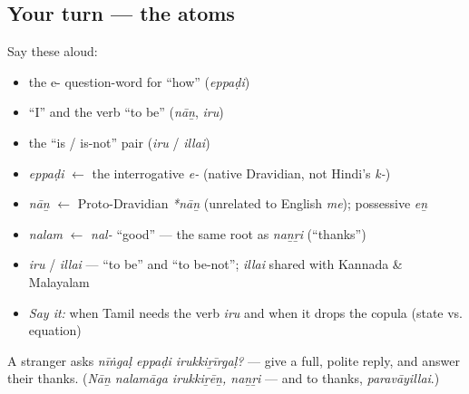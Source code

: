 \subsection*{Your turn — the atoms}
Say these aloud:

\begin{itemize}
\raggedright
  \item the e- question-word for \textquotedblleft{}how\textquotedblright{} (\emph{eppaḍi})
  \item \textquotedblleft{}I\textquotedblright{} and the verb \textquotedblleft{}to be\textquotedblright{} (\emph{nāṉ}, \emph{iru})
  \item the \textquotedblleft{}is / is-not\textquotedblright{} pair (\emph{iru} / \emph{illai})
\end{itemize}

\begin{grammarlens}[title={What you've built — roots you now carry}]
\begin{itemize}
\raggedright
  \item \emph{eppaḍi} $\leftarrow$ the interrogative \emph{e-} (native Dravidian, not Hindi's \emph{k-})
  \item \emph{nāṉ} $\leftarrow$ Proto-Dravidian \emph{*nāṉ} (unrelated to English \emph{me}); possessive \emph{eṉ}
  \item \emph{nalam} $\leftarrow$ \emph{nal-} \textquotedblleft{}good\textquotedblright{} — the same root as \emph{naṉṟi} (\textquotedblleft{}thanks\textquotedblright{})
  \item \emph{iru} / \emph{illai} — \textquotedblleft{}to be\textquotedblright{} and \textquotedblleft{}to be-not\textquotedblright{}; \emph{illai} shared with Kannada \& Malayalam
\end{itemize}
\end{grammarlens}

\begin{grammarlens}[title={Grammar lens — what you now hold}]
\begin{itemize}
\raggedright
  \item \emph{Say it:} when Tamil needs the verb \emph{iru} and when it drops the copula (state vs. equation)
\end{itemize}
\end{grammarlens}

\begin{tcolorbox}[breakable,colback=teal!4,colframe=teal!35!black,title={Before you move on}]
A stranger asks \emph{nīṅgaḷ eppaḍi irukkiṟīrgaḷ?} — give a full, polite reply, and answer their thanks. (\emph{Nāṉ nalamāga irukkiṟēṉ, naṉṟi} — and to thanks, \emph{paravāyillai}.)
\end{tcolorbox}
